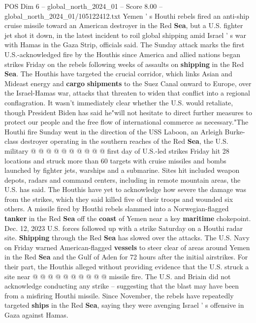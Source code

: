\begin{textsample}{POS Dim 6 – global\_north\_2024\_01 – Score 8.00 – global\_north\_2024\_01/105122412.txt}  \label{ex:f6_pos_099}
Yemen ' s Houthi rebels fired an anti-ship cruise missile toward an American destroyer in the Red \textbf{Sea}, but a U.S. fighter jet shot it down, in the latest incident to roil global shipping amid Israel ' s war with Hamas in the Gaza Strip, officials said.
The Sunday attack marks the first U.S.-acknowledged fire by the Houthis since America and allied nations began strikes Friday on the rebels following weeks of assaults on \textbf{shipping} in the Red \textbf{Sea}.
The Houthis have targeted the crucial corridor, which links Asian and Mideast energy and \textbf{cargo} \textbf{shipments} to the Suez Canal onward to Europe, over the Israel-Hamas war, attacks that threaten to widen that conflict into a regional conflagration.
It wasn't immediately clear whether the U.S. would retaliate, though President Biden has said he"will not hesitate to direct further measures to protect our people and the free flow of international commerce as necessary."The Houthi fire Sunday went in the direction of the USS Laboon, an Arleigh Burke-class destroyer operating in the southern reaches of the Red \textbf{Sea}, the U.S. military @ @ @ @ @ @ @ @ @ @ first day of U.S.-led strikes Friday hit 28 locations and struck more than 60 targets with cruise missiles and bombs launched by fighter jets, warships and a submarine.
Sites hit included weapon depots, radars and command centers, including in remote mountain areas, the U.S. has said.
The Houthis have yet to acknowledge how severe the damage was from the strikes, which they said killed five of their troops and wounded six others.
A missile fired by Houthi rebels slammed into a Norwegian-flagged \textbf{tanker} in the Red \textbf{Sea} off the \textbf{coast} of Yemen near a key \textbf{maritime} chokepoint.
Dec. 12, 2023 U.S. forces followed up with a strike Saturday on a Houthi radar site. \textbf{Shipping} through the Red \textbf{Sea} has slowed over the attacks.
The U.S.
Navy on Friday warned American-flagged \textbf{vessels} to steer clear of areas around Yemen in the Red \textbf{Sea} and the Gulf of Aden for 72 hours after the initial airstrikes.
For their part, the Houthis alleged without providing evidence that the U.S. struck a site near @ @ @ @ @ @ @ @ @ @ missile fire.
The U.S. and Briain did not acknowledge conducting any strike -- suggesting that the blast may have been from a misfiring Houthi missile.
Since November, the rebels have repeatedly targeted \textbf{ships} in the Red \textbf{Sea}, saying they were avenging Israel ' s offensive in Gaza against Hamas.

\end{textsample}
